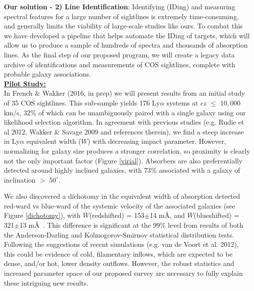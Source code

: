 \documentclass[12pt]{article}
\begin{document}

\textbf{Our solution - 2) Line Identification}: Identifying (IDing) and measuring spectral features for a large number of sightlines is extremely time-consuming, and generally limits the viability of large-scale studies like ours. To combat this we have developed a pipeline that helps automate the IDing of targets, which will allow us to produce a sample of hundreds of spectra and thousands of absorption lines. As the final step of our proposed program, we will create a legacy data archive of identifications and measurements of COS sightlines, complete with probable galaxy associations.\\

\noindent \textbf{\underline{Pilot Study:}}\\
\indent In French $\&$ Wakker (2016, in prep) we will present results from an initial study of 35 COS sightlines. This sub-sample yields 176 Ly$\alpha$ systems at $cz$ $\leq$ $10,000$ km/s, $32\%$ of which can be unambiguously paired with a single galaxy using our likelihood selection algorithm. In agreement with previous studies (e.g. Rudie et al 2012, Wakker $\&$ Savage 2009 and references therein), we find a steep increase in Ly$\alpha$ equivalent width ($W$) with decreasing impact parameter. However, normalizing for galaxy size produces a stronger correlation, so proximity is clearly not the only important factor (Figure \ref{virial}). Absorbers are also preferentially detected around highly inclined galaxies, with $73\%$ associated with a galaxy of inclination $>$ $50^{\circ}$. 

We also discovered a dichotomy in the equivalent width of absorption detected red-ward vs blue-ward of the systemic velocity of the associated galaxies (see Figure \ref{dichotomy}), with $\overline{W}$(redshifted) = 153$\pm$14 m\AA, and $\overline{W}$(blueshifted) = 321$\pm$13 m\AA~. This difference is significant at the $99\%$ level from results of both the Anderson-Darling and Kolmogorov-Smirnov statistical distribution tests. Following the suggestions of recent simulations (e.g. van de Voort et al. 2012), this could be evidence of cold, filamentary inflows, which are expected to be dense, and/or hot, lower density outflows. However, the robust statistics and increased parameter space of our proposed survey are necessary to fully explain these intriguing new results.\\
\end{document}
